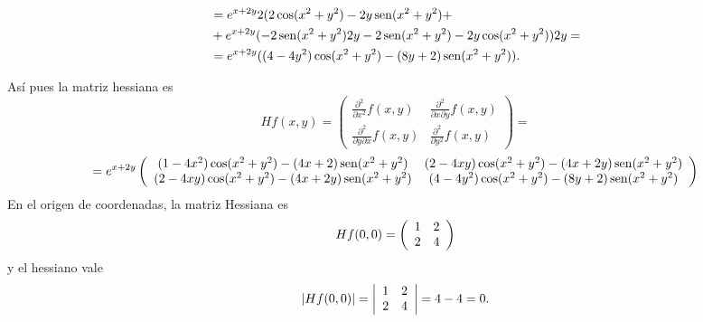 {\begin{enumerate}
\begin{align*}
&= e^{x+2y}2(2\cos(x^{2}+y^{2})-2y\operatorname{sen}(x^{2}+y^{2})+\\
&+ e^{x+2y}(-2\operatorname{sen}(x^{2}+y^{2})2y-2\operatorname{sen}(x^{2}+y^{2})-2y\cos(x^{2}+y^{2}))2y = \\
&= e^{x+2y}((4-4y^{2})\cos(x^{2}+y^{2})-(8y+2)\operatorname{sen}(x^{2}+y^{2})).
\end{align*}
\end{enumerate}
Así pues la matriz hessiana es
\[Hf(x,y)= \left(
\begin{array}{cc}
\frac{\partial^{2}}{\partial x^{2}}f(x,y) & \frac{\partial^{2}}{\partial x\partial y}f(x,y)\\
\frac{\partial^{2}}{\partial y\partial x}f(x,y) & \frac{\partial^{2}}{\partial y^{2}}f(x,y)
\end{array}
\right) =
\]
\[=
e^{x+2y} \left(
\begin{array}[]{cc}
(1-4x^{2})\cos(x^{2}+y^{2})-(4x+2)\sen(x^{2}+y^{2}) & (2-4xy)\cos(x^{2}+y^{2})-(4x+2y)\sen(x^{2}+y^{2})\\
(2-4xy)\cos(x^{2}+y^{2})-(4x+2y)\sen(x^{2}+y^{2}) & (4-4y^{2})\cos(x^{2}+y^{2})-(8y+2)\sen(x^{2}+y^{2})
\end{array}
\right)
\]
En el origen de coordenadas, la matriz Hessiana es
\[
Hf(0,0)=\left(
\begin{array}[]{cc}
1 & 2 \\
2 & 4
\end{array}
\right)
\]
y el hessiano vale
\[
|Hf(0,0)|=\left|
\begin{array}[]{cc}
1 & 2 \\
2 & 4
\end{array}
\right| =
4-4 = 0.
\]
}


